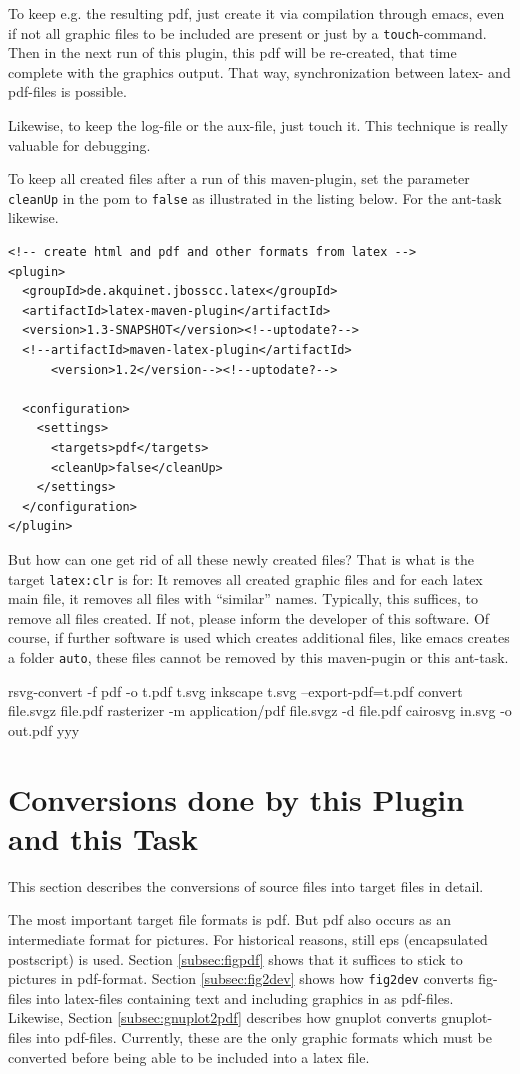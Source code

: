 \documentclass[12pt]{article}
\begin{document}
To keep e.g. the resulting pdf, 
just create it via compilation through emacs, 
even if not all graphic files to be included are present 
or just by a {\tt touch}-command. 
Then in the next run of this plugin, 
this pdf will be re-created, 
that time complete with the graphics output. 
That way, synchronization between latex- and pdf-files is possible. 

Likewise, to keep the log-file or the aux-file, just touch it. 
This technique is really valuable for debugging. 

To keep all created files after a run of this maven-plugin, 
set the parameter {\tt cleanUp} in the pom 
to {\tt false} as illustrated in the listing below. 
For the ant-task likewise. 
%
\lstset{language=xml, basicstyle=\small}
\begin{lstlisting}
<!-- create html and pdf and other formats from latex -->
<plugin>
  <groupId>de.akquinet.jbosscc.latex</groupId>
  <artifactId>latex-maven-plugin</artifactId>
  <version>1.3-SNAPSHOT</version><!--uptodate?-->
  <!--artifactId>maven-latex-plugin</artifactId>
      <version>1.2</version--><!--uptodate?-->
	
  <configuration>
    <settings>
      <targets>pdf</targets>
      <cleanUp>false</cleanUp>
    </settings>
  </configuration>
</plugin>
\end{lstlisting}


But how can one get rid of all these newly created files? 
That is what is the target {\tt latex:clr} is for: 
It removes all created graphic files 
and for each latex main file, it removes all files with ``similar'' names. 
Typically, this suffices, to remove all files created. 
If not, please inform the developer of this software. 
Of course, if further software is used which creates additional files, 
like emacs creates a folder {\tt auto}, 
these files cannot be removed by this maven-pugin or this ant-task. 


rsvg-convert -f pdf -o t.pdf t.svg
inkscape t.svg --export-pdf=t.pdf
convert file.svgz file.pdf 
rasterizer -m application/pdf file.svgz -d file.pdf
cairosvg in.svg -o out.pdf
yyy
\section{Conversions done by this Plugin and this Task}\label{sec:conversions}

This section describes the conversions of source files into target files 
in detail. 

The most important target file formats is pdf. 
But pdf also occurs as an intermediate format for pictures. 
For historical reasons, still eps (encapsulated postscript) is used. 
Section \ref{subsec:figpdf} shows that it suffices to stick to pictures 
in pdf-format. 
Section \ref{subsec:fig2dev} shows how {\tt fig2dev} converts fig-files 
into latex-files containing text and including graphics in as pdf-files. 
Likewise, Section \ref{subsec:gnuplot2pdf} describes 
how gnuplot converts gnuplot-files into pdf-files. 
Currently, these are the only graphic formats which must be converted 
before being able to be included into a latex file. 
\end{document}
